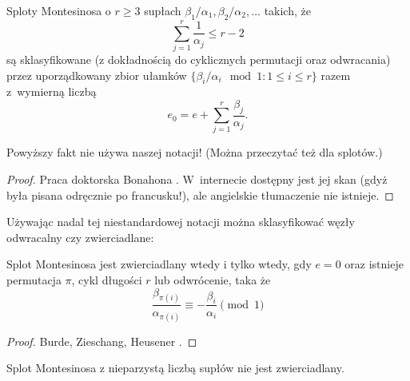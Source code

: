 \begin{proposition}
    Sploty Montesinosa o $r \ge 3$ supłach $\beta_1/\alpha_1, \beta_2/\alpha_2, \ldots$ takich, że
    \begin{equation}
        \sum_{j=1}^r \frac{1}{\alpha_j} \le r - 2
    \end{equation}
    są sklasyfikowane (z dokładnością do cyklicznych permutacji oraz odwracania) przez uporządkowany zbior ułamków $\{\beta_i/\alpha_i \mod 1 : 1 \le i \le r\}$ razem z~wymierną liczbą
    \begin{equation}
        e_0 = e + \sum_{j=1}^r \frac{\beta_j}{\alpha_j}.
    \end{equation}
\end{proposition}

Powyższy fakt nie używa naszej notacji!
(Można przeczytać też \cite[s. 28]{kawauchi1996} dla splotów.)

\begin{proof}
%
    Praca doktorska Bonahona \cite{bonahon1979}.
    W~internecie dostępny jest jej skan (gdyż była pisana odręcznie po francusku!), ale angielskie tłumaczenie nie istnieje.
\end{proof}

Używając nadal tej niestandardowej notacji można sklasyfikować węzły odwracalny czy zwierciadlane:

\begin{proposition}
%
    Splot Montesinosa jest zwierciadlany wtedy i tylko wtedy, gdy $e = 0$ oraz istnieje permutacja $\pi$, cykl długości $r$ lub odwrócenie, taka że
    \begin{equation}
        \frac{\beta_{\pi(i)}}{\alpha_{\pi(i)}} \equiv -\frac{\beta_i}{\alpha_i} \pmod 1
    \end{equation}
\end{proposition}

\begin{proof}
    Burde, Zieschang, Heusener \cite[s. 230]{burde2014}.
\end{proof}

\begin{corollary}
    Splot Montesinosa z nieparzystą liczbą supłów nie jest zwierciadlany.
\end{corollary}

